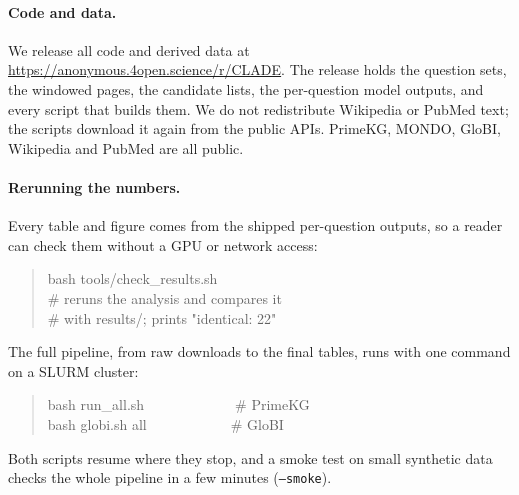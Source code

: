 \paragraph{Code and data.}
We release all code and derived data at \url{https://anonymous.4open.science/r/CLADE}. The release holds the question sets, the windowed pages, the candidate lists, the per-question model outputs, and every script that builds them. We do not redistribute Wikipedia or PubMed text; the scripts download it again from the public APIs. PrimeKG, MONDO, GloBI, Wikipedia and PubMed are all public.

\paragraph{Rerunning the numbers.}
Every table and figure comes from the shipped per-question outputs, so a reader can check them without a GPU or network access:
\begin{quote}
\footnotesize\ttfamily
bash tools/check\_results.sh\\
\# reruns the analysis and compares it\\
\# with results/; prints "identical: 22"
\end{quote}
The full pipeline, from raw downloads to the final tables, runs with one command on a SLURM cluster:
\begin{quote}
\footnotesize\ttfamily
bash run\_all.sh~~~~~~~~~~~~~\# PrimeKG\\
bash globi.sh all~~~~~~~~~~~~\# GloBI
\end{quote}
Both scripts resume where they stop, and a smoke test on small synthetic data checks the whole pipeline in a few minutes (\texttt{--smoke}).
